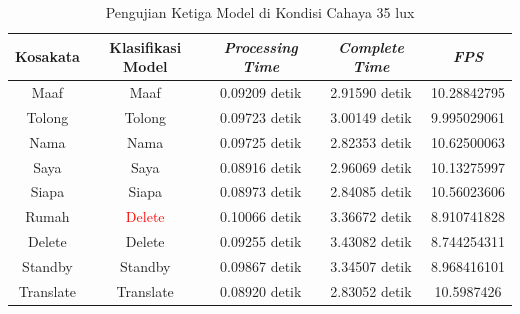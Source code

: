 \newpage
\begin{longtable}{|c|c|c|c|c|}
  \caption{Pengujian Ketiga Model di Kondisi Cahaya 35 lux}
  \label{tb:prediksigelap3}                                   \\
  \hline
  \rowcolor[HTML]{C0C0C0}
  \textbf{Kosakata} & \textbf{Klasifikasi Model} & \textbf{\emph{Processing Time}} & \textbf{\emph{Complete Time}} & \textbf{\emph{FPS}}\\
  \hline
  Maaf              & Maaf                          & 0.09209 detik                           & 2.91590 detik                                  & 10.28842795\\
  Tolong            & Tolong                        & 0.09723 detik                           & 3.00149 detik                                  & 9.995029061\\
  Nama              & Nama                          & 0.09725 detik                           & 2.82353 detik                                  & 10.62500063\\
  Saya              & Saya                          & 0.08916 detik                           & 2.96069 detik                                  & 10.13275997\\
  Siapa             & Siapa                         & 0.08973 detik                           & 2.84085 detik                                  & 10.56023606\\
  Rumah             & \textcolor{red}{Delete}       & 0.10066 detik                           & 3.36672 detik                                  & 8.910741828\\
  Delete            & Delete                        & 0.09255 detik                           & 3.43082 detik                                  & 8.744254311\\
  Standby           & Standby                       & 0.09867 detik                           & 3.34507 detik                                  & 8.968416101\\
  Translate         & Translate                     & 0.08920 detik                           & 2.83052 detik                                  & 10.5987426\\
  \hline
\end{longtable}


